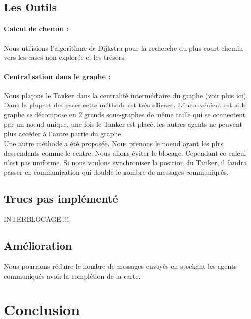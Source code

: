 \documentclass[10pt]{article}
\newcommand\tab[1][0.65cm]{\hspace*{#1}}
\begin{document}
\subsection{Les Outils}
\paragraph{Calcul de chemin :} Nous utilisions l'algorithme de Dijkstra pour la recherche du plus court chemin vers les cases non explorée et les trésors.
\paragraph{Centralisation dans le graphe :} Nous plaçons le Tanker dans la centralité intermédiaire du graphe (voir plus \href{https://en.wikipedia.org/wiki/Betweenness_centrality}{ici}). Dans la plupart des cases cette méthode est très efficace. L'inconvénient est si le graphe se décompose en 2 grands sous-graphes de même taille qui se connectent par un noeud unique, une fois le Tanker est placé, les autres agents ne peuvent plus accéder à l'autre partie du graphe.\\
\tab Une autre méthode a été proposée. Nous prenons le noeud ayant les plus descendants comme le centre. Nous allons éviter le blocage. Cependant ce calcul n'est pas uniforme. Si nous voulons synchroniser la position du Tanker, il faudra passer en communication qui double le nombre de messages communiqués.
	
\subsection{Trucs pas implémenté}
{\Huge INTERBLOCAGE !!!}
\subsection{Amélioration}
Nous pourrions réduire le nombre de messages envoyés en stockant les agents communiqués avoir la complétion de la carte.
\section{Conclusion}



	
\end{document}
